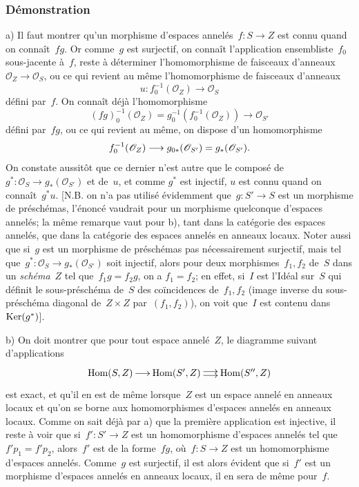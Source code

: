 \subsubsection*{D\'emonstration} a) Il faut montrer qu'un morphisme d'espaces
annel\'es~$f\colon S\to Z$ est connu quand on
conna\^it~$fg$. Or comme~$g$ est surjectif, on conna\^it
l'application ensembliste~$f_{0}$ sous-jacente \`a~$f$, reste \`a
d\'eterminer l'homomorphisme de faisceaux
d'anneaux~$\mathcal{O}_{Z}\to \mathcal{O}_{S}$, ou ce qui revient au
m\^eme l'homomorphisme
de faisceaux d'anneaux
$$
u\colon f_{0}^{-1}(\mathcal{O}_{Z})\to \mathcal{O}_{S}
$$
d\'efini par~$f$. On conna\^it d\'ej\`a l'homomorphisme
$$
(fg)_{0}^{-1}(\mathcal{O}_{Z})=
g_{0}^{-1}(f_{0}^{-1}(\mathcal{O}_{Z}))\to \mathcal{O}_{S'}
$$
d\'efini par~$fg$, ou ce qui revient au m\^eme, on dispose d'un
homomorphisme
$$
f_{0}^{-1}(\mathcal{O}_{Z})\to
g_{0*}(\mathcal{O}_{S'})=g_*(\mathcal{O}_{S'})\quoi.
$$
On constate aussit\^ot que ce dernier n'est autre que le compos\'e
de~$g^*\colon \mathcal{O}_{S}\to g_*(\mathcal{O}_{S'})$ et
de~$u$, et comme $g^*$ est injectif, $u$ est connu quand on
conna\^it~$g^*u$. [N.B. on n'a pas utilis\'e \'evidemment
que~$g\colon S'\to S$ est un morphisme de pr\'esch\'emas,
l'\'enonc\'e vaudrait pour un morphisme quelconque d'espaces
annel\'es; la m\^eme remarque vaut pour b), tant dans la
cat\'egorie des espaces annel\'es, que dans la cat\'egorie des
espaces annel\'es en anneaux locaux. Noter aussi que si~$g$ est un
morphisme de pr\'esch\'emas pas n\'ecessairement surjectif, mais
tel que~$g^*\colon \mathcal{O}_{S}\to g_*(\mathcal{O}_{S'})$
soit injectif, alors pour deux morphismes~$f_{1},f_{2}$ de~$S$ dans un
\emph{schéma}~$Z$ tel que~$f_{1}g=f_{2}g$, on a $f_{1}=f_{2}$; en
effet, si~$I$ est l'Id\'eal sur~$S$ qui d\'efinit le
sous-pr\'esch\'ema de~$S$ des co\"incidences de~$f_{1},f_{2}$
(image inverse du sous-pr\'esch\'ema diagonal de~$Z\times Z$
par~$(f_{1},f_{2})$), on voit que~$I$ est contenu
dans~$\operatorname{Ker}(g^*)$].

b) On doit montrer que pour tout espace annel\'e~$Z$, le diagramme
suivant d'applications
$$
\xymatrix@C=.5cm{{\mathrm{Hom}(S,Z)}\ar[r]&{\mathrm{Hom}(S',Z)}\ar@<2pt>[r]\ar@<-2pt>[r]&{\mathrm{Hom}(S'',Z)}}
$$
est exact, et qu'il en est de m\^eme lorsque~$Z$ est un espace
annel\'e en anneaux locaux et qu'on se borne aux homomorphismes
d'espaces annel\'es en anneaux locaux. Comme on sait d\'ej\`a par a)
que la premi\`ere application est injective, il reste \`a voir que
si~$f'\colon S'\to Z$ est un homomorphisme d'espaces annel\'es tel
que~$f'p_{1}=f'p_{2}$,
alors~$f'$ est de la forme~$fg$, o\`u~$f\colon S\to Z$ est un
homomorphisme d'espaces annel\'es. Comme~$g$ est surjectif, il est
alors \'evident que si~$f'$ est un morphisme d'espaces annel\'es
en anneaux locaux, il en sera de m\^eme pour~$f$.

